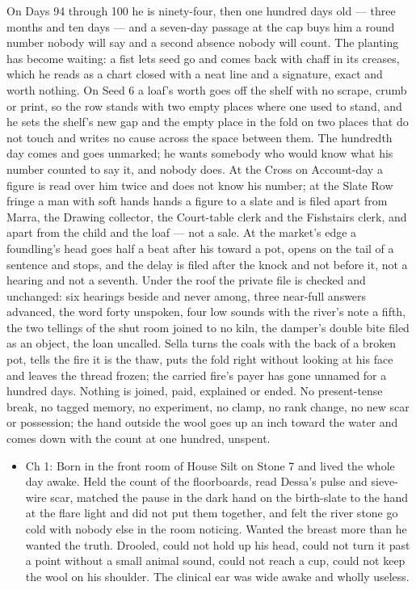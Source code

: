 \documentclass{design/chronicle}
\begin{document}
{On Days 94 through 100 he is ninety-four, then one hundred days old --- three months and ten days --- and a seven-day passage at the cap buys him a round number nobody will say and a second absence nobody will count. The planting has become waiting: a fist lets seed go and comes back with chaff in its creases, which he reads as a chart closed with a neat line and a signature, exact and worth nothing. On Seed 6 a loaf’s worth goes off the shelf with no scrape, crumb or print, so the row stands with two empty places where one used to stand, and he sets the shelf’s new gap and the empty place in the fold on two places that do not touch and writes no cause across the space between them. The hundredth day comes and goes unmarked; he wants somebody who would know what his number counted to say it, and nobody does. At the Cross on Account-day a figure is read over him twice and does not know his number; at the Slate Row fringe a man with soft hands hands a figure to a slate and is filed apart from Marra, the Drawing collector, the Court-table clerk and the Fishstairs clerk, and apart from the child and the loaf --- not a sale. At the market’s edge a foundling’s head goes half a beat after his toward a pot, opens on the tail of a sentence and stops, and the delay is filed after the knock and not before it, not a hearing and not a seventh. Under the roof the private file is checked and unchanged: six hearings beside and never among, three near-full answers advanced, the word forty unspoken, four low sounds with the river’s note a fifth, the two tellings of the shut room joined to no kiln, the damper’s double bite filed as an object, the loan uncalled. Sella turns the coals with the back of a broken pot, tells the fire it is the thaw, puts the fold right without looking at his face and leaves the thread frozen; the carried fire’s payer has gone unnamed for a hundred days. Nothing is joined, paid, explained or ended. No present-tense break, no tagged memory, no experiment, no clamp, no rank change, no new scar or possession; the hand outside the wool goes up an inch toward the water and comes down with the count at one hundred, unspent.

\begin{itemize}[leftmargin=1.4em,itemsep=1pt,topsep=3pt,parsep=0pt]

\item Ch 1: Born in the front room of House Silt on Stone 7 and lived the whole day awake. Held the count of the floorboards, read Dessa’s pulse and sieve-wire scar, matched the pause in the dark hand on the birth-slate to the hand at the flare light and did not put them together, and felt the river stone go cold with nobody else in the room noticing. Wanted the breast more than he wanted the truth. Drooled, could not hold up his head, could not turn it past a point without a small animal sound, could not reach a cup, could not keep the wool on his shoulder. The clinical ear was wide awake and wholly useless.


\end{itemize}}
\end{document}
